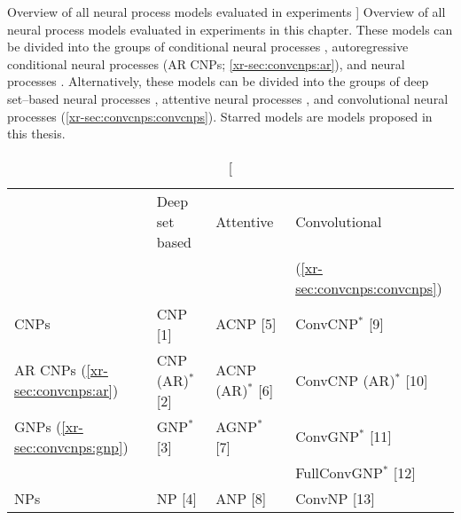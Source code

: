 \documentclass[12pt, twoside]{report}
\newcommand{\xrprefix}[1]{xr-#1}
\begin{document}
\begin{table}[t]
    \centering
    \caption
    [
        Overview of all neural process models evaluated in experiments
    ]
    {
        Overview of all neural process models evaluated in experiments in this chapter.
        These models can be divided into the groups of 
        conditional neural processes \parencite[CNP;][]{Garnelo:2018:Conditional_Neural_Processes},
        autoregressive conditional neural processes (AR CNPs; \cref{\xrprefix{sec:convcnps:ar}}),
        and neural processes \parencite[NPs;][]{Garnelo:2018:Neural_Processes}.
        Alternatively, these models can be divided into the groups of
        deep set--based neural processes \parencite{Garnelo:2018:Conditional_Neural_Processes},
        attentive neural processes \parencite{Kim:2019:Attentive_Neural_Processes},
        and convolutional neural processes (\cref{\xrprefix{sec:convcnps:convcnps}}).
        Starred models are models proposed in this thesis.
    }
    \label{tab:overview_models}
    \small
    \setlength{\tabcolsep}{3pt}
    \begin{tabular}{llll}
        \toprule
        & Deep set based
        & Attentive
        & Convolutional \\
        & {\footnotesize\parencite{Garnelo:2018:Conditional_Neural_Processes}}
        & {\footnotesize\parencite{Kim:2019:Attentive_Neural_Processes}}
        & {\footnotesize(\cref{\xrprefix{sec:convcnps:convcnps}})} \\ \midrule
        CNPs {\footnotesize\parencite{Garnelo:2018:Conditional_Neural_Processes}}
            & CNP {\footnotesize[1]}
            & ACNP {\footnotesize[5]}
            & ConvCNP${}^*$ {\footnotesize[9]}
            \\
        AR CNPs {\footnotesize(\cref{\xrprefix{sec:convcnps:ar}})}
            & CNP (AR)${}^*$ {\footnotesize[2]}
            & ACNP (AR)${}^*$ {\footnotesize[6]}
            & ConvCNP (AR)${}^*$ {\footnotesize[10]}
            \\
        GNPs {\footnotesize(\cref{\xrprefix{sec:convcnps:gnp}})}
            & GNP${}^*$ {\footnotesize[3]}
            & AGNP${}^*$ {\footnotesize[7]}
            & ConvGNP${}^*$ {\footnotesize[11]} \\
        &&  & FullConvGNP${}^*$ {\footnotesize[12]}
            \\
        NPs {\footnotesize\parencite{Garnelo:2018:Neural_Processes}}
            & NP {\footnotesize[4]}
            & ANP {\footnotesize[8]}
            & ConvNP {\footnotesize[13]}

\end{tabular}
\end{table}
\end{document}
